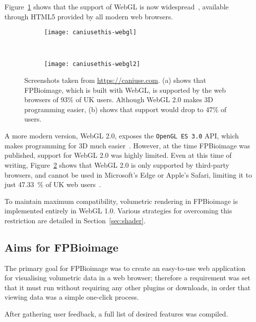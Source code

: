 Figure~\ref{fig:caniusethis-webgl} shows that the support of WebGL is now widespread~\cite{caniuse}, available through HTML5 provided by all modern web browsers.

\begin{figure}[b!]
\centering
\begin{subfigure}[b]{1.0\textwidth}
\texttt{[image: caniusethis-webgl]}
\caption{} \label{fig:caniusethis-webgl}
\end{subfigure}

~\newline
\begin{subfigure}[b]{1.0\textwidth}
\texttt{[image: caniusethis-webgl2]}
\caption{} \label{fig:caniusethis-webgl2}
\end{subfigure}
\caption[FPBioimage: WebGL is supported by 93\% of users browsing the web]{Screenshots taken from \url{https://caniuse.com}\cite{caniuse}. (a) shows that FPBioimage, which is built with WebGL, is supported by the web browsers of 93\% of UK users. Although WebGL 2.0 makes 3D programming easier, (b) shows that support would drop to 47\% of users.  }
\label{fig:caniusethis}
\end{figure}

A more modern version, WebGL 2.0, exposes the \texttt{OpenGL ES 3.0} API, which makes programming for 3D much easier~\cite{webgl2}.
However, at the time FPBioimage was published, support for WebGL 2.0 was highly limited.
Even at this time of writing, Figure~\ref{fig:caniusethis-webgl2} shows that WebGL 2.0 is only supported by third-party browsers, and cannot be used in Microsoft's Edge or Apple's Safari, limiting it to just \SI{47.33}{\percent} of UK web users~\cite{caniuse}.

To maintain maximum compatibility, volumetric rendering in FPBioimage is implemented entirely in WebGL 1.0.
Various strategies for overcoming this restriction are detailed in Section~\ref{sec:shader}.

\subsection{Aims for FPBioimage}
The primary goal for FPBioimage was to create an easy-to-use web application for visualising volumetric data in a web browser; therefore a requirement was set that it must run without requiring any other plugins or downloads, in order that viewing data was a simple one-click process.

After gathering user feedback, a full list of desired features was compiled.


